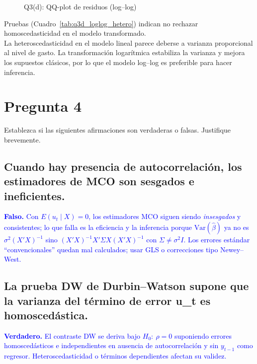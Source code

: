 \documentclass[10pt]{article}
\begin{document}
{\begin{figure}[H]
            \caption{Q3(d): QQ-plot de residuos (log–log)}
            \label{fig:q3_d_qq}
        \end{figure}
        Pruebas (Cuadro~\ref{tab:q3d_loglog_hetero}) indican no rechazar homoscedasticidad en el modelo transformado.
        \\
        
        La heteroscedasticidad en el modelo lineal parece deberse a varianza proporcional al nivel de gasto. La transformación logarítmica estabiliza la varianza y mejora los supuestos clásicos, por lo que el modelo log–log es preferible para hacer inferencia.
    }
\section{Pregunta 4}
Establezca si las siguientes afirmaciones son verdaderas o falsas. Justifique brevemente.
\subsection{Cuando hay presencia de autocorrelación, los estimadores de MCO son sesgados e ineficientes.}
\textcolor{blue}{
    \textbf{Falso.} Con $E(u_t\mid X)=0$, los estimadores MCO siguen siendo \emph{insesgados} y consistentes; lo que falla es la eficiencia y la inferencia porque $\mathrm{Var}(\hat\beta)$ ya no es $\sigma^2(X'X)^{-1}$ sino $(X'X)^{-1}X'\Sigma X(X'X)^{-1}$ con $\Sigma\neq\sigma^2 I$. Los errores estándar “convencionales” quedan mal calculados; usar GLS o correcciones tipo Newey--West.
}
\subsection{La prueba DW de Durbin--Watson supone que la varianza del término de error u\_t es homoscedástica.}
\textcolor{blue}{
    \textbf{Verdadero.} El contraste DW se deriva bajo $H_0\!:\ \rho=0$ suponiendo errores homoscedásticos e independientes en ausencia de autocorrelación y sin $y_{t-1}$ como regresor. Heteroscedasticidad o términos dependientes afectan su validez.
}
\end{document}
